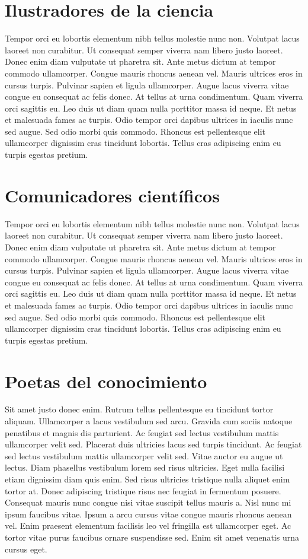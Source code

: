 \section{Ilustradores de la ciencia}
Tempor orci eu lobortis elementum nibh tellus molestie nunc non. Volutpat lacus laoreet non curabitur. Ut consequat semper viverra nam libero justo laoreet. Donec enim diam vulputate ut pharetra sit. Ante metus dictum at tempor commodo ullamcorper. Congue mauris rhoncus aenean vel. Mauris ultrices eros in cursus turpis. Pulvinar sapien et ligula ullamcorper. Augue lacus viverra vitae congue eu consequat ac felis donec. At tellus at urna condimentum. Quam viverra orci sagittis eu. Leo duis ut diam quam nulla porttitor massa id neque. Et netus et malesuada fames ac turpis. Odio tempor orci dapibus ultrices in iaculis nunc sed augue. Sed odio morbi quis commodo. Rhoncus est pellentesque elit ullamcorper dignissim cras tincidunt lobortis. Tellus cras adipiscing enim eu turpis egestas pretium.

\section{Comunicadores científicos}
Tempor orci eu lobortis elementum nibh tellus molestie nunc non. Volutpat lacus laoreet non curabitur. Ut consequat semper viverra nam libero justo laoreet. Donec enim diam vulputate ut pharetra sit. Ante metus dictum at tempor commodo ullamcorper. Congue mauris rhoncus aenean vel. Mauris ultrices eros in cursus turpis. Pulvinar sapien et ligula ullamcorper. Augue lacus viverra vitae congue eu consequat ac felis donec. At tellus at urna condimentum. Quam viverra orci sagittis eu. Leo duis ut diam quam nulla porttitor massa id neque. Et netus et malesuada fames ac turpis. Odio tempor orci dapibus ultrices in iaculis nunc sed augue. Sed odio morbi quis commodo. Rhoncus est pellentesque elit ullamcorper dignissim cras tincidunt lobortis. Tellus cras adipiscing enim eu turpis egestas pretium.

\section{Poetas del conocimiento}
Sit amet justo donec enim. Rutrum tellus pellentesque eu tincidunt tortor aliquam. Ullamcorper a lacus vestibulum sed arcu. Gravida cum sociis natoque penatibus et magnis dis parturient. Ac feugiat sed lectus vestibulum mattis ullamcorper velit sed. Placerat duis ultricies lacus sed turpis tincidunt. Ac feugiat sed lectus vestibulum mattis ullamcorper velit sed. Vitae auctor eu augue ut lectus. Diam phasellus vestibulum lorem sed risus ultricies. Eget nulla facilisi etiam dignissim diam quis enim. Sed risus ultricies tristique nulla aliquet enim tortor at. Donec adipiscing tristique risus nec feugiat in fermentum posuere. Consequat mauris nunc congue nisi vitae suscipit tellus mauris a. Nisl nunc mi ipsum faucibus vitae. Ipsum a arcu cursus vitae congue mauris rhoncus aenean vel. Enim praesent elementum facilisis leo vel fringilla est ullamcorper eget. Ac tortor vitae purus faucibus ornare suspendisse sed. Enim sit amet venenatis urna cursus eget.

